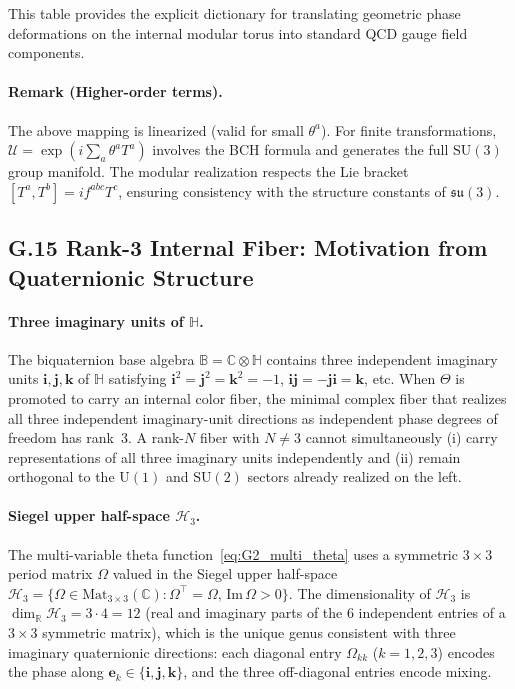 This table provides the explicit dictionary for translating geometric phase deformations on the internal modular torus into standard QCD gauge field components.

\paragraph{Remark (Higher-order terms).}
The above mapping is linearized (valid for small $\theta^a$). For finite transformations, $\mathcal{U} = \exp(i\sum_a \theta^a T^a)$ involves the BCH formula and generates the full $\mathrm{SU}(3)$ group manifold. The modular realization respects the Lie bracket $[T^a,T^b]=if^{abc}T^c$, ensuring consistency with the structure constants of $\mathfrak{su}(3)$.


\subsection*{G.15 Rank-3 Internal Fiber: Motivation from Quaternionic Structure}
\label{sec:G15_rank3}

\paragraph{Three imaginary units of $\mathbb{H}$.}
The biquaternion base algebra $\mathbb{B}=\mathbb{C}\otimes\mathbb{H}$ contains three
independent imaginary units $\mathbf{i},\mathbf{j},\mathbf{k}$ of $\mathbb{H}$ satisfying
$\mathbf{i}^2=\mathbf{j}^2=\mathbf{k}^2=-1$,
$\mathbf{i}\mathbf{j}=-\mathbf{j}\mathbf{i}=\mathbf{k}$, etc.
When $\Theta$ is promoted to carry an internal color fiber, the minimal complex fiber
that realizes all three independent imaginary-unit directions as independent phase degrees
of freedom has rank~3.  A rank-$N$ fiber with $N\neq 3$ cannot simultaneously
(i) carry representations of all three imaginary units independently and
(ii) remain orthogonal to the $\mathrm{U}(1)$ and $\mathrm{SU}(2)$ sectors already
realized on the left.

\paragraph{Siegel upper half-space $\mathcal{H}_3$.}
The multi-variable theta function~\eqref{eq:G2_multi_theta} uses a symmetric $3\times3$
period matrix $\Omega$ valued in the Siegel upper half-space
$\mathcal{H}_3 = \{\Omega\in\mathrm{Mat}_{3\times3}(\mathbb{C}):\Omega^\top=\Omega,\,
\mathrm{Im}\,\Omega>0\}$.
The dimensionality of $\mathcal{H}_3$ is $\dim_\mathbb{R}\mathcal{H}_3 = 3\cdot 4 = 12$
(real and imaginary parts of the 6 independent entries of a $3\times3$ symmetric matrix),
which is the unique genus consistent with three imaginary quaternionic directions:
each diagonal entry $\Omega_{kk}$ ($k=1,2,3$) encodes the phase along $\mathbf{e}_k\in\{\mathbf{i},\mathbf{j},\mathbf{k}\}$,
and the three off-diagonal entries encode mixing.

